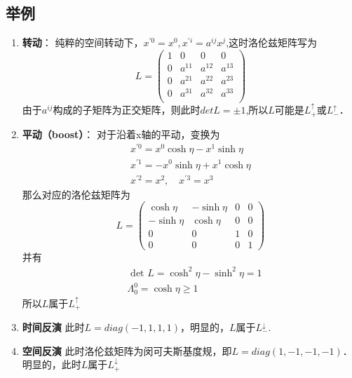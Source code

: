 \subsection{举例}
\begin{enumerate}
\item \textbf{转动}： 纯粹的空间转动下，$x^{\prime 0}=x^{0}, x^{\prime i}=a^{i j} x^{j}$,这时洛伦兹矩阵写为
\begin{equation}       %
L=\left(                 %
  \begin{array}{cccc}   %
   1& 0 & 0 & 0\\  %
   0& a^{11} &  a^{12} &  a^{13}\\  %
   0& a^{21} &  a^{22} &  a^{23}\\  %
   0& a^{31} &  a^{32} &  a^{33}\\  %
  \end{array}
\right)                 %
\end{equation}
由于$a^{ij}$构成的子矩阵为正交矩阵，则此时$detL=\pm1$,所以$L$可能是$L_{+}^{\uparrow}$或$L_{-}^{\uparrow}$．
\item \textbf{平动（boost）}： 对于沿着x轴的平动，变换为
\begin{equation}\begin{array}{c}
x^{\prime 0}=x^{0} \cosh \eta-x^{1} \sinh \eta \\
x^{\prime 1}=-x^{0} \sinh \eta+x^{1} \cosh \eta \\
x^{\prime 2}=x^{2}, \quad x^{\prime 3}=x^{3}
\end{array}\end{equation}
那么对应的洛伦兹矩阵为
\begin{equation}L=\left(\begin{array}{cccc}
\cosh \eta & -\sinh \eta & 0 & 0 \\
-\sinh \eta & \cosh \eta & 0 & 0 \\
0 & 0 & 1 & 0 \\
0 & 0 & 0 & 1
\end{array}\right)\end{equation}
并有\\
\begin{equation}\begin{aligned}
&\text { det } L=\cosh ^{2} \eta-\sinh ^{2} \eta=1\\
&\Lambda_{0}^{0}=\cosh \eta \geqslant 1
\end{aligned}\end{equation}
所以$L$属于$L_{+}^{\uparrow}$
\item \textbf{时间反演}
此时$L=diag(-1,1,1,1)$，明显的，$L$属于$L_{-}^{\downarrow}$.
\item \textbf{空间反演}
此时洛伦兹矩阵为闵可夫斯基度规，即$L=diag(1,-1,-1,-1)$．明显的，此时$L$属于$L_{+}^{\downarrow}$
\end{enumerate}

